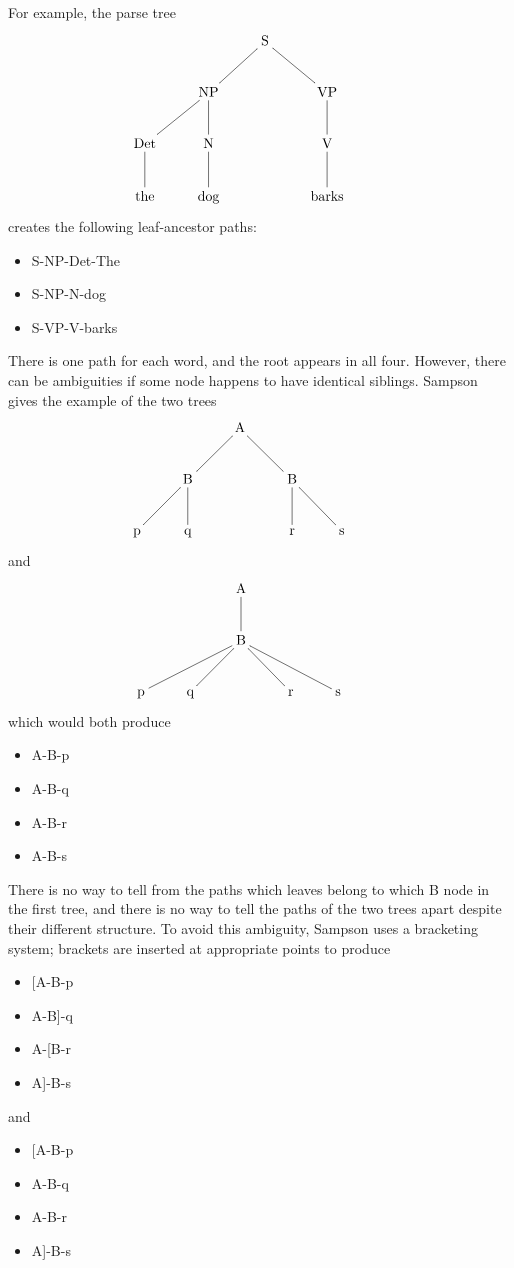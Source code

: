\documentclass[11pt]{article}
\begin{document}
For example, the parse tree
\[\xymatrix{
  &&\textrm{S} \ar@{-}[dl] \ar@{-}[dr] &&\\
  &\textrm{NP} \ar@{-}[d] \ar@{-}[dl] &&\textrm{VP} \ar@{-}[d]\\
  \textrm{Det} \ar@{-}[d] & \textrm{N} \ar@{-}[d] && \textrm{V} \ar@{-}[d] \\
\textrm{the}& \textrm{dog} && \textrm{barks}\\}
\]
creates the following leaf-ancestor paths:

\begin{itemize}
\item S-NP-Det-The
\item S-NP-N-dog
\item S-VP-V-barks
\end{itemize}

There is one path for each word, and the root appears
in all four. However, there can be ambiguities if some
node happens
to have identical siblings. Sampson gives the example
of the two trees
\[\xymatrix{
  &&\textrm{A} \ar@{-}[dl] \ar@{-}[dr] &&&\\
  &\textrm{B} \ar@{-}[d] \ar@{-}[dl] &&\textrm{B} \ar@{-}[d] \ar@{-}[dr] & \\
  \textrm{p} & \textrm{q} && \textrm{r} & \textrm{s} \\
}
\]
and
\[\xymatrix{
  &&\textrm{A} \ar@{-}[d] &&&\\
  &&\textrm{B} \ar@{-}[dll] \ar@{-}[dl] \ar@{-}[dr] \ar@{-}[drr]&&& \\
  \textrm{p} & \textrm{q} && \textrm{r} & \textrm{s} \\
}
\]
which would both produce

  \begin{itemize}
  \item A-B-p
  \item A-B-q
  \item A-B-r
  \item A-B-s
  \end{itemize}

  There is no way to tell from the paths which leaves belong to which
  B node in the first tree, and there is no way to tell the paths of
  the two trees apart despite their different structure. To avoid this
  ambiguity, Sampson uses a bracketing system; brackets are inserted
  at appropriate points to produce
  \begin{itemize}
  \item $[$A-B-p
  \item A-B]-q
  \item A-[B-r
  \item A]-B-s
  \end{itemize}
and
  \begin{itemize}
  \item $[$A-B-p
  \item A-B-q
  \item A-B-r
  \item A]-B-s
  \end{itemize}
\end{document}
